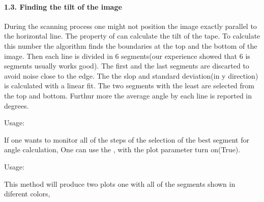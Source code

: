\documentclass[letterpaper,10pt,english]{sphinxmanual}
\begin{document}


\paragraph{1.3. Finding the tilt of the image}
\label{\detokenize{tutorials:finding-the-tilt-of-the-image}}
\sphinxAtStartPar
During the scanning process one might not position the image exactly parallel to the
horizontal line. The property of  can calculate the tilt of the tape. To calculate
this number the algorithm finds the boundaries at the top and the bottom of the image.
Then each line is divided in 6 segments(our experience showed that 6 is segments usually works good).
The first and the last segments are discarted to avoid noise close to the edge. The the slop and standard
deviation(in y direction) is calculated with a linear fit. The two
segments with the least are selected from the top and bottom. Furthur more the average angle
by each line is reported in degrees.

\sphinxAtStartPar
Usage:

\begin{sphinxVerbatim}[commandchars=\\\{\}]
\end{sphinxVerbatim}

\sphinxAtStartPar
If one wants to monitor all of the steps of the selection of the best segment for angle calculation,
One can use the , with the plot parameter turn on(True).

\sphinxAtStartPar
Usage:

\begin{sphinxVerbatim}[commandchars=\\\{\}]
\end{sphinxVerbatim}

\sphinxAtStartPar
This method will produce two plots one with all of the segments shown in diferent colors,

\end{document}
